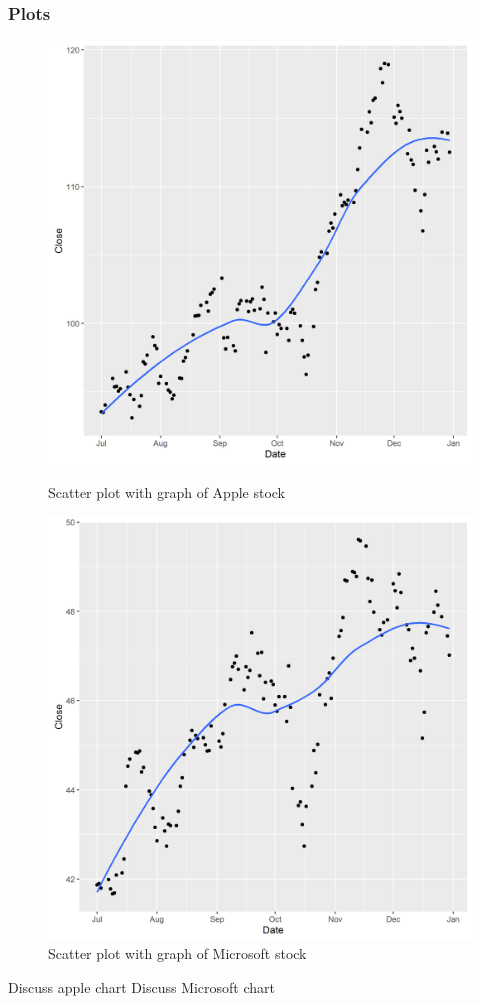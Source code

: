 \documentclass[paper=a4, fontsize=11pt]{scrartcl} %
\numberwithin{equation}{section} %
\numberwithin{figure}{section} %
\numberwithin{table}{section} %
\begin{document}
\subsubsection{Plots}
\begin{figure}[!htb]
  \includegraphics[width=\linewidth]{graph/AAPL8.png}
  \caption{Scatter plot with graph of Apple stock}
\endminipage\hfill
{}
  \includegraphics[width=\linewidth]{graph/MSFT8.png}
  \caption{Scatter plot with graph of Microsoft stock}
\endminipage\hfill

\end{figure}
Discuss apple chart
Discuss Microsoft chart
\end{document}
